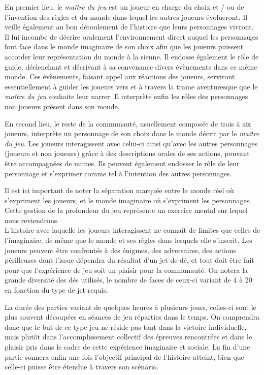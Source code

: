 En premier lieu, le \textit{maître du jeu} est un joueur en charge du choix et  / ou de l'invention des règles et du monde dans lequel les autres joueurs évolueront. Il veille également au bon déroulement de l'histoire que leurs personnages vivront. Il lui incombe de décrire oralement l'environnement direct auquel les personnages font face dans le monde imaginaire de son choix afin que les joueurs puissent accorder leur représentation du monde à la sienne. Il endosse également le rôle de guide, déclenchant et décrivant à sa convenance divers évènements dans ce même monde. Ces évènements, faisant appel aux réactions des joueurs, serviront essentiellement à guider les joueurs vers et à travers la trame aventuresque que le \textit{maître du jeu} souhaite leur narrer. Il interprète enfin les rôles des personnages non joueurs présent dans son monde.

En second lieu, le reste de la communauté, usuellement composée de trois à six joueurs, interprète un personnage de son choix dans le monde décrit par le \textit{maître du jeu}. Les joueurs interagissent avec celui-ci ainsi qu'avec les autres personnages (joueurs et non joueurs) grâce à des descriptions orales de ses actions, pouvant être accompagnées de mimes. Ils peuvent également endosser le rôle de leur personnage et s'exprimer comme tel à l'intention des autres personnages.

Il est ici important de noter la séparation marquée entre le monde réel où s'expriment les joueurs, et le monde imaginaire où s'expriment les personnages. Cette gestion de la profondeur du jeu représente un exercice mental sur lequel nous reviendrons.\\


L'histoire avec laquelle les joueurs interagissent ne connaît de limites que celles de l'imaginaire, de même que le monde et ses règles dans lesquels elle s'inscrit. Les joueurs peuvent être confrontés à des énigmes, des adversaires, des actions périlleuses dont l'issue dépendra du résultat d'un jet de dé, et tout doit être fait pour que l'expérience de jeu soit un plaisir pour la communauté. On notera la grande diversité des dés utilisés, le nombre de faces de ceux-ci variant de 4 à 20 en fonction du type de jet requis.

La durée des parties variant de quelques heures à plusieurs jours, celles-ci sont le plus souvent découpées en séances de jeu réparties dans le temps. On comprendra donc que le but de ce type jeu ne réside pas tant dans la victoire individuelle, mais plutôt dans l'accomplissement collectif des épreuves rencontrées et dans le plaisir pris dans le cadre de cette expérience imaginaire et sociale. La fin d'une partie sonnera enfin une fois l'objectif principal de l'histoire atteint, bien que celle-ci puisse être étendue à travers son scénario.\\


